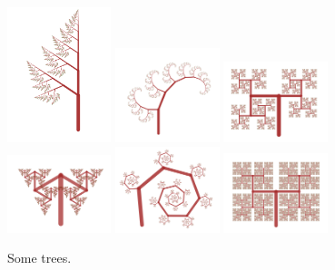             \begin{figure}[ht]
                \caption{\label{simple_tree_02} Some trees.}
                \centering
                \includegraphics[width=0.27\textwidth]{img/Simple_Techniques/Trees/tree_02.png}
                \includegraphics[width=0.27\textwidth]{img/Simple_Techniques/Trees/tree_03.png}
                \includegraphics[width=0.27\textwidth]{img/Simple_Techniques/Trees/tree_04.png}
                \includegraphics[width=0.27\textwidth]{img/Simple_Techniques/Trees/tree_05.png}
                \includegraphics[width=0.27\textwidth]{img/Simple_Techniques/Trees/tree_06.png}
                \includegraphics[width=0.27\textwidth]{img/Simple_Techniques/Trees/tree_07.png}                
            \end{figure}

